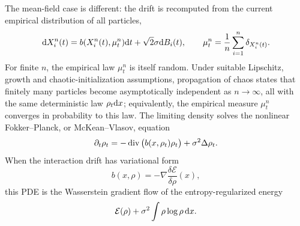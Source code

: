 The mean-field case is different: the drift is recomputed from the current empirical distribution of all particles,
\[
	\mathrm{d} X_i^n(t)=b(X_i^n(t),\mu_t^n)\mathrm{d} t+\sqrt{2}\sigma\mathrm{d} B_i(t),
	\qquad
	\mu_t^n=\frac1n\sum_{i=1}^n\delta_{X_i^n(t)} .
\]
For finite $n$, the empirical law $\mu_t^n$ is itself random. Under suitable Lipschitz, growth and chaotic-initialization assumptions, propagation of chaos states that finitely many particles become asymptotically independent as $n\to\infty$, all with the same deterministic law $\rho_t\mathrm{d} x$; equivalently, the empirical measure $\mu_t^n$ converges in probability to this law. The limiting density solves the nonlinear Fokker--Planck, or McKean--Vlasov, equation
\[
	\partial_t \rho_t
	=
	-\operatorname{div}\big(b(x,\rho_t)\rho_t\big)
	+
	\sigma^2\Delta\rho_t .
\]
When the interaction drift has variational form
\[
	b(x,\rho)=-\nabla \frac{\delta \mathcal E}{\delta \rho}(x),
\]
	this PDE is the Wasserstein gradient flow of the entropy-regularized energy
	\[
		\mathcal E(\rho)+\sigma^2\int \rho\log\rho\,\mathrm{d} x .
	\]

